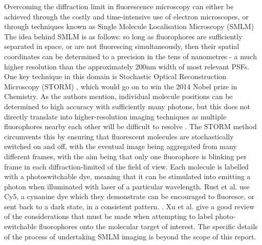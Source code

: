 \documentclass[11pt]{article}
\begin{document}
Overcoming the diffraction limit in fluorescence microscopy can either be achieved through the costly and time-intensive use of electron microscopes, or through techniques known as Single Molecule Localisation Microscopy (SMLM) \cite{rust2006sub, Lelek2021} The idea behind SMLM is as follows: so long as fluorophores are sufficiently separated in space, or are not fluorescing simultaneously, then their spatial coordinates can be determined to a precision in the tens of nanometres - a much higher resolution than the approximately 200nm width of most relevant PSFs. One key technique in this domain is
Stochastic Optical Reconstruction Microscopy (STORM) \cite{rust2006sub}, which would go on to win the 2014 Nobel prize in Chemistry. As the authors mention, individual molecule positions can be determined to high accuracy with sufficiently many photons, but this does not directly translate into higher-resolution imaging techniques as multiple fluorophores nearby each other will be difficult to resolve \cite{rust2006sub}. The STORM method circumvents this by ensuring that fluorescent molecules are stochastically switched on and off, with the eventual image being aggregated from many different frames, with the aim being that only one fluorophore is blinking per frame in each diffraction-limited of the field of view. Each molecule is labelled with a photoswitchable dye, meaning that it can be stimulated into emitting a photon when illuminated with laser of a particular wavelength. Rust et al. use Cy5, a cynanine dye which they demonstrate can be encouraged to fluoresce, or sent back to a dark state, in a consistent pattern.  \cite{rust2006sub, cyanineDye}. Xu et al. \cite{stormAndThunderstorm} give a good review of the considerations that must be made when attempting to label photo-switchable fluorophores onto the molecular target of interest. The specific details of the process of undertaking SMLM imaging is beyond the scope of this report.\\ 
\end{document}
